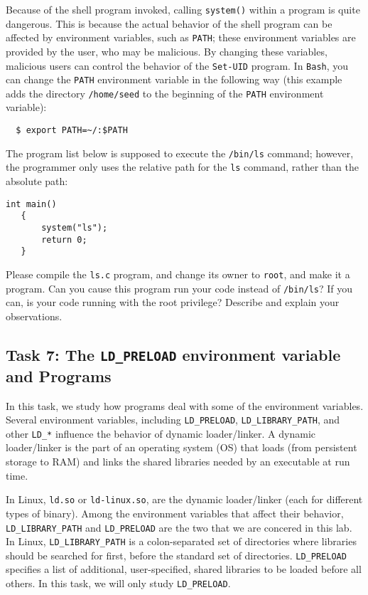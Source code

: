 Because of the shell program invoked, calling {\tt system()} 
within a \setuid program is quite dangerous. This is because the actual behavior of the 
shell program can be affected by environment variables, such
as {\tt PATH}; these environment variables are provided by the user, who 
may be malicious.  By changing these variables, malicious users can control
the behavior of the {\tt Set-UID} program. In {\tt Bash}, you can
change the {\tt PATH} environment variable in the following way (this example 
adds the directory {\tt /home/seed} to the beginning of the {\tt PATH} environment variable):
\begin{verbatim}
  $ export PATH=~/:$PATH
\end{verbatim}


The  program list below is supposed to execute the {\tt /bin/ls} command; 
however, the programmer only uses the relative path for the {\tt ls} 
command, rather than the absolute path:

\begin{Verbatim}[frame=single] 
   int main()
   {
       system("ls");
       return 0;
   }
\end{Verbatim}

Please compile the {\tt ls.c} program, and change its owner to {\tt root}, and 
make it a \setuid program.  Can you cause this \setuid program run your code instead of 
{\tt /bin/ls}?  If you can, is your code running with the root privilege?
Describe and explain your observations. 


\subsection{Task 7: The {\tt LD\_PRELOAD} environment variable and \setuid
Programs}

In this task, we study how \setuid programs deal
with some of the environment variables.
Several environment variables, including {\tt LD\_PRELOAD}, 
{\tt LD\_LIBRARY\_PATH}, and other {\tt LD\_*} influence the 
behavior of dynamic loader/linker.
A dynamic loader/linker is the part of an operating system (OS) that 
loads (from persistent storage to RAM) and links the shared libraries 
needed by an executable at run time. 

In Linux, {\tt ld.so} or {\tt ld-linux.so}, are the dynamic 
loader/linker (each for different types of binary).
Among the environment variables that affect their behavior,
{\tt LD\_LIBRARY\_PATH} and {\tt LD\_PRELOAD} are the two
that we are concered in this lab. 
In Linux, {\tt LD\_LIBRARY\_PATH} is a colon-separated set
of directories where libraries should be searched for first, before the
standard set of directories. 
{\tt LD\_PRELOAD} specifies a list of additional, user-specified, shared libraries to
be loaded before all others. In this task, we will only 
study {\tt LD\_PRELOAD}.


